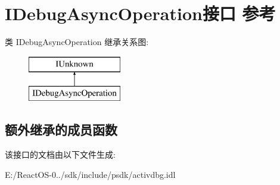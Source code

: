 \hypertarget{interface_i_debug_async_operation}{}\section{I\+Debug\+Async\+Operation接口 参考}
\label{interface_i_debug_async_operation}
类 I\+Debug\+Async\+Operation 继承关系图\+:\begin{figure}[H]
\begin{center}
\leavevmode
\includegraphics[height=2.000000cm]{interface_i_debug_async_operation}
\end{center}
\end{figure}
\subsection*{额外继承的成员函数}


该接口的文档由以下文件生成\+:\begin{DoxyCompactItemize}
\item 
E\+:/\+React\+O\+S-\/0../sdk/include/psdk/activdbg.\+idl\end{DoxyCompactItemize}
